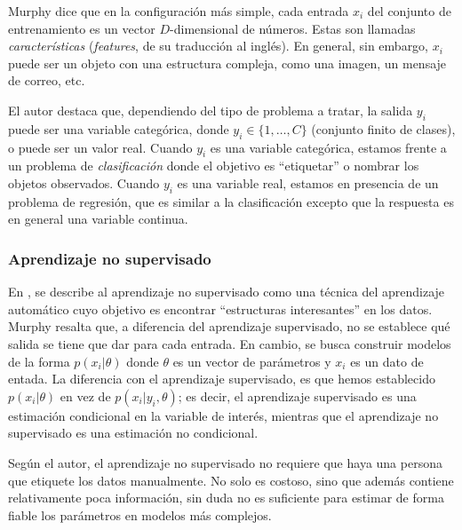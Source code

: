 	Murphy dice que en la configuración más simple, cada entrada $x_i$ del conjunto de entrenamiento es un vector $D$-dimensional de números. Estas son llamadas \textit{características} (\textit{features}, de su traducción al inglés). En general, sin embargo, $x_i$ puede ser un objeto con una estructura compleja, como una imagen, un mensaje de correo, etc.
	
	El autor destaca que, dependiendo del tipo de problema a tratar, la salida $y_i$ puede ser una variable categórica, donde $y_i \in \{1,\dots,C\}$ (conjunto finito de clases), o puede ser un valor real. Cuando $y_i$ es una variable categórica, estamos frente a un problema de \textit{clasificación} donde el objetivo es ``etiquetar'' o nombrar los objetos observados. Cuando $y_i$ es una variable real, estamos en presencia de un problema de regresión, que es similar a la clasificación excepto que la respuesta es en general una variable continua.	
	

	\subsubsection{Aprendizaje no supervisado}
	
		En \cite{Murphy12}, se describe al aprendizaje no supervisado como una técnica del aprendizaje automático cuyo objetivo es encontrar ``estructuras interesantes'' en los datos. Murphy resalta que, a diferencia del aprendizaje supervisado, no se establece qué salida se tiene que dar para cada entrada. En cambio, se busca construir modelos de la forma $p(x_i | \theta)$ donde $\theta$ es un vector de parámetros y $x_i$ es un dato de entada. La diferencia con el aprendizaje supervisado, es que hemos establecido $p(x_i | \theta)$ en vez de $p(x_i | y_i, \theta)$; es decir, el aprendizaje supervisado es una estimación condicional en la variable de interés, mientras que el aprendizaje no supervisado es una estimación no condicional.
		
		Según el autor, el aprendizaje no supervisado no requiere que haya una persona que etiquete los datos manualmente. No solo es costoso, sino que además contiene relativamente poca información, sin duda no es suficiente para estimar de forma fiable los parámetros en modelos más complejos.
